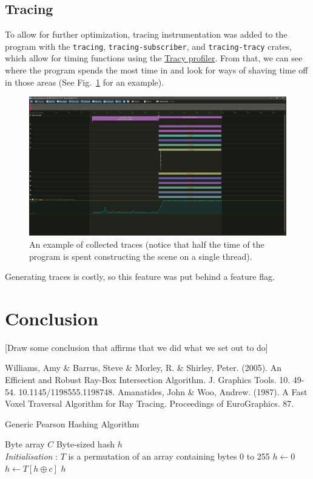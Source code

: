 \documentclass[conference]{IEEEtran}
\begin{document}
\subsection{Tracing}

To allow for further optimization, tracing instrumentation was added to the program with the \verb|tracing|, \verb|tracing-subscriber|, and \verb|tracing-tracy| crates, which allow for timing functions using the \href{https://github.com/wolfpld/tracy}{Tracy profiler}.
From that, we can see where the program spends the most time in and look for ways of shaving time off in those areas (See Fig.~\ref{tracing} for an example).

\begin{figure}[htbp]
\centerline{\includegraphics[width=\linewidth]{tracing}}
\caption{An example of collected traces (notice that half the time of the program is spent constructing the scene on a single thread).}
\label{tracing}
\end{figure}

Generating traces is costly, so this feature was put behind a feature flag.

\section{Conclusion}

[Draw some conclusion that affirms that we did what we set out to do]

\begin{thebibliography}{00}
 Williams, Amy \& Barrus, Steve \& Morley, R. \& Shirley, Peter. (2005). An Efficient and Robust Ray-Box Intersection Algorithm. J. Graphics Tools. 10. 49-54. 10.1145/1198555.1198748. 
 Amanatides, John \& Woo, Andrew. (1987). A Fast Voxel Traversal Algorithm for Ray Tracing. Proceedings of EuroGraphics. 87.
\end{thebibliography}

\begin{algorithm}[H]
\caption{Generic Pearson Hashing Algorithm}
\begin{algorithmic}[1]
\REQUIRE Byte array $C$
\ENSURE Byte-sized hash $h$
\\ \textit{Initialisation} : $T$ is a permutation of an array containing bytes 0 to 255
\STATE $h \gets 0$
\STATE $h \gets T[h \oplus c]$
\ENDFOR
\RETURN $h$
\end{algorithmic}
\label{pearson}
\end{algorithm}
\end{document}
